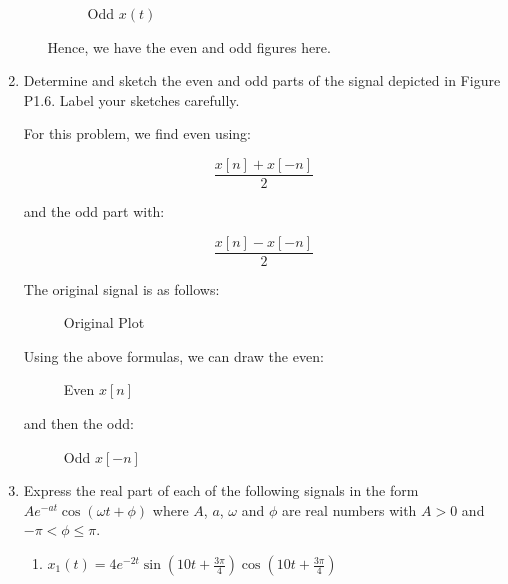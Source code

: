 \begin{enumerate}
\begin{enumerate}
        \begin{figure}[H]
          \centering
          
          \caption{Odd $x(t)$}
          \label{fig:18}
        \end{figure}

        Hence, we have the even and odd figures here.

    \end{enumerate}

  \item Determine and sketch the even and odd parts of the signal depicted in Figure P1.6. Label your sketches carefully.

    For this problem, we find even using:

    $$\frac{x[n]+x[-n]}{2}$$

    and the odd part with:

    $$\frac{x[n]-x[-n]}{2}$$

    The original signal is as follows:

        \begin{figure}[H]
          \centering
          
          \caption{Original Plot}
          \label{fig:19}
        \end{figure}

        Using the above formulas, we can draw the even:

        \begin{figure}[H]
          \centering
          
          \caption{Even $x[n]$}
          \label{fig:20}
        \end{figure}

        and then the odd:

        \begin{figure}[H]
          \centering
          
          \caption{Odd $x[-n]$}
          \label{fig:21}
        \end{figure}

  \item Express the real part of each of the following signals in the form $Ae^{-at}\cos(\omega t + \phi)$ where $A$, $a$, $\omega$ and $\phi$ are real numbers with $A > 0$ and $-\pi < \phi \leq \pi$.

    \begin{enumerate}

      \item $x_1(t)=4e^{-2t}\sin\left( 10t+\frac{3\pi}{4}\right)\cos\left( 10t+\frac{3\pi}{4} \right)$


\end{enumerate}
\end{enumerate}
